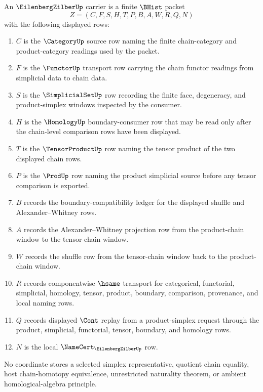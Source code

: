 \begin{definition}
\label{def:eilenberg-zilber-carrier}
An $\EilenbergZilberUp$ carrier is a finite $\BHist$ packet
$$
Z=(C,F,S,H,T,P,B,A,W,R,Q,N)
$$
with the following displayed rows:
\begin{enumerate}
\item $C$ is the $\CategoryUp$ source row naming the finite chain-category and product-category readings used by the packet.
\item $F$ is the $\FunctorUp$ transport row carrying the chain functor readings from simplicial data to chain data.
\item $S$ is the $\SimplicialSetUp$ row recording the finite face, degeneracy, and product-simplex windows inspected by the consumer.
\item $H$ is the $\HomologyUp$ boundary-consumer row that may be read only after the chain-level comparison rows have been displayed.
\item $T$ is the $\TensorProductUp$ row naming the tensor product of the two displayed chain rows.
\item $P$ is the $\ProdUp$ row naming the product simplicial source before any tensor comparison is exported.
\item $B$ records the boundary-compatibility ledger for the displayed shuffle and Alexander--Whitney rows.
\item $A$ records the Alexander--Whitney projection row from the product-chain window to the tensor-chain window.
\item $W$ records the shuffle row from the tensor-chain window back to the product-chain window.
\item $R$ records componentwise $\hsame$ transport for categorical, functorial, simplicial, homology, tensor, product, boundary, comparison, provenance, and local naming rows.
\item $Q$ records displayed $\Cont$ replay from a product-simplex request through the product, simplicial, functorial, tensor, boundary, and homology rows.
\item $N$ is the local $\NameCert_{\EilenbergZilberUp}$ row.
\end{enumerate}
No coordinate stores a selected simplex representative, quotient chain equality, host chain-homotopy equivalence, unrestricted naturality theorem, or ambient homological-algebra principle.
\end{definition}


